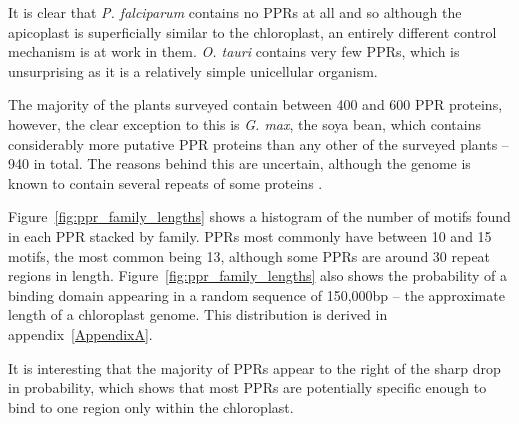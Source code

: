 It is clear that \emph{P. falciparum} contains no PPRs at all and so
although the apicoplast is superficially similar to the chloroplast, 
an entirely different control mechanism is at work in them.
\emph{O. tauri} contains very few PPRs, which is unsurprising as it is a
relatively simple unicellular organism.

The majority of the plants surveyed contain between 400 and 600 PPR proteins,
however, the clear exception to this is \emph{G. max}, the soya bean, 
which contains considerably more putative PPR proteins than any other of the 
surveyed plants -- 940 in total.
The reasons behind this are uncertain, although the genome is known to contain
several repeats of some proteins \citep{Schmutz2010}.

Figure~\ref{fig:ppr_family_lengths} shows a histogram of the number of motifs
found in each PPR stacked by family.
PPRs most commonly have between 10 and 15 motifs, the most common being 13, 
although some PPRs are around 30 repeat regions in length.
Figure~\ref{fig:ppr_family_lengths} also shows the probability of a binding
domain appearing in a random sequence of 150,000bp -- the approximate length of
a chloroplast genome.
This distribution is derived in appendix~\ref{AppendixA}.

It is interesting that the majority of PPRs appear to the right of the sharp
drop in probability, which shows that most PPRs are potentially specific enough
to bind to one region only within the chloroplast.


